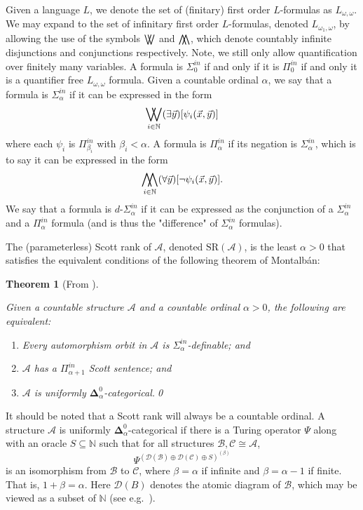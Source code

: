 \documentclass{amsart}%
\newtheorem{theorem}{Theorem}
\numberwithin{theorem}{section}
\newcommand{\N}{\mathbb{N}}
\newcommand{\A}{\mathcal{A}}
\newcommand{\B}{\mathcal{B}}
\newcommand{\CC}{\mathcal{C}}
\newcommand{\D}{\mathcal{D}}
\newcommand{\0}{\emptyset}
\DeclareMathOperator*{\WW}{\bigwedge\mkern-12mu\bigwedge}
\DeclareMathOperator*{\VV}{\bigvee\mkern-12mu\bigvee}
\newcommand{\E}{\exists}
\newcommand{\SR}{\text{SR}}
\begin{document}
Given a language $L$, we denote the set of (finitary) first order $L$-formulas as $L_{\omega,\omega}$. We may expand to the set of infinitary first order $L$-formulas, denoted $L_{\omega_1,\omega}$, by allowing the use of the symbols $\VV$ and $\WW$, which denote countably infinite disjunctions and conjunctions respectively. Note, we still only allow quantification over finitely many variables. A formula is $\Sigma^{in}_0$ if and only if it is $\Pi^{in}_0$ if and only it is a  quantifier free $L_{\omega,\omega}$ formula. Given a countable ordinal $\alpha$, we say that a formula is $\Sigma^{in}_{\alpha}$ if it can be expressed in the form $$\VV_{i\in \N} (\E\vec y)[ \psi_i(\vec x,\vec y)]$$ where each $\psi_i$ is $\Pi^{in}_{\beta_i}$ with  $\beta_i<\alpha$. A formula is $\Pi^{in}_\alpha$ if its negation is $\Sigma^{in}_\alpha$, which is to say it can be expressed in the form $$\WW_{i\in \N} (\forall\vec y)[ \neg \psi_i(\vec x,\vec y)].$$ We say that a formula is $d$-$\Sigma^{in}_\alpha$ if it can be expressed as the conjunction of a $\Sigma^{in}_\alpha$ and a $\Pi^{in}_\alpha$ formula (and is thus the "difference" of $\Sigma^{in}_\alpha$ formulas). 

The (parameterless) Scott rank of $\A$, denoted $\SR(\A)$, is the least $\alpha>0$ that satisfies the equivalent conditions of the following theorem of Montalb\'an:

\begin{theorem}[From \cite{Scott-rank}]
\label{robuster scott rank}

Given a countable structure $\A$ and a countable ordinal $\alpha>0$, the following are equivalent:


\begin{enumerate}
    \item Every automorphism orbit in $\A$ is $\Sigma^{in}_\alpha$-definable; and
    \item $\A$ has a $\Pi^{in}_{\alpha+1}$ Scott sentence; and
    \item $\A$ is uniformly $\boldsymbol{\Delta}^0_\alpha$-categorical.\qed
\end{enumerate}
\end{theorem} 

It should be noted that a Scott rank will always be a countable ordinal. A structure $\A$ is uniformly $\boldsymbol{\Delta}^0_\alpha$-categorical if  there is a Turing operator $\Psi$ along with an oracle $S\subseteq \N$ such that for all structures $\B,\CC\cong \A $, $$\Psi^{(\D(\B)\oplus \D(\CC)\oplus S)^{(\beta)}}$$ is an isomorphism from $\B$ to $\CC$, where $\beta = \alpha$ if infinite and $\beta= \alpha-1$ if finite. That is, $1+\beta=\alpha$. Here $\D(B)$ denotes the atomic diagram of $\B$, which may be viewed as a subset of $\N$ (see e.g.\ \cite{CST1}).
\end{document}
